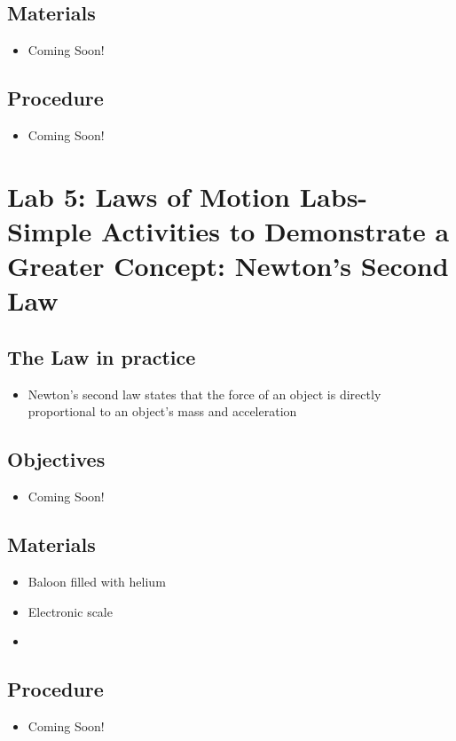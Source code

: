 \documentclass{article}
\begin{document}
    \subsection{Materials}
        \begin{itemize}
            \item Coming Soon!
        \end{itemize}
    \subsection{Procedure}
        \begin{itemize}
            \item Coming Soon!
        \end{itemize}
\pagebreak  
\setcounter{section}{5}
\setcounter{subsection}{0} 
\section*{Lab 5: Laws of Motion Labs- Simple Activities to Demonstrate a Greater Concept: Newton's Second Law}
    \subsection{The Law in practice}
        \begin{itemize} 
            \item Newton's second law states that the force of an object is directly \\proportional to an object's mass and acceleration
        \end{itemize}
    \subsection{Objectives}
        \begin{itemize}
            \item Coming Soon!
        \end{itemize}
    \subsection{Materials}
        \begin{itemize}
            \item Baloon filled with helium
            \item Electronic scale
            \item 
        \end{itemize}
    \subsection{Procedure}
        \begin{itemize}
            \item Coming Soon!
        \end{itemize}
\pagebreak
\setcounter{section}{6}
\setcounter{subsection}{0}
\end{document}
